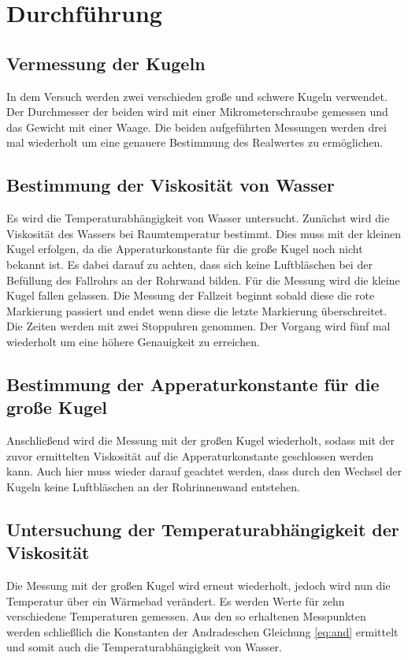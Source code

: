 \section{Durchführung}
\label{sec:Durchführung}
\subsection{Vermessung der Kugeln}
In dem Versuch werden zwei verschieden große und schwere Kugeln verwendet.
Der Durchmesser der beiden wird mit einer Mikrometerschraube gemessen und das Gewicht mit einer Waage.
Die beiden aufgeführten Messungen werden drei mal wiederholt um eine genauere Bestimmung des Realwertes zu ermöglichen.
\subsection{Bestimmung der Viskosität von Wasser}
Es wird die Temperaturabhängigkeit von Wasser untersucht.
Zunächst wird die Viskosität des Wassers bei Raumtemperatur bestimmt. Dies muss mit der kleinen Kugel erfolgen,
da die Apperaturkonstante für die große Kugel noch nicht bekannt ist. Es dabei darauf zu achten, dass sich keine Luftbläschen bei der Befüllung des Fallrohrs an der Rohrwand bilden.
Für die Messung wird die kleine Kugel fallen gelassen.
Die Messung der Fallzeit beginnt sobald diese die rote Markierung passiert und endet wenn diese die letzte Markierung überschreitet.
Die Zeiten werden mit zwei Stoppuhren genommen.
Der Vorgang wird fünf mal wiederholt um eine höhere Genauigkeit zu erreichen.
\subsection{Bestimmung der Apperaturkonstante für die große Kugel}
Anschließend wird die Messung mit der großen Kugel
wiederholt, sodass mit der zuvor ermittelten Viskosität auf die Apperaturkonstante geschlossen werden kann.
Auch hier muss wieder darauf geachtet werden, dass durch den Wechsel der Kugeln keine Luftbläschen an der Rohrinnenwand entstehen.
\subsection{Untersuchung der Temperaturabhängigkeit der Viskosität}
Die Messung mit der großen Kugel wird erneut wiederholt, jedoch wird nun die Temperatur über ein Wärmebad verändert.
Es werden Werte für zehn verschiedene Temperaturen gemessen.
Aus den so erhaltenen Messpunkten werden schließlich die Konstanten der Andradeschen Gleichung \eqref{eq:and} ermittelt
und somit auch die Temperaturabhängigkeit von Wasser.
